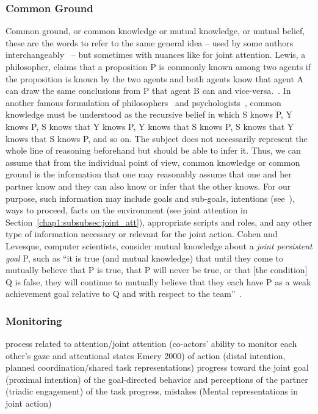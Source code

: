 \documentclass[a4paper,11pt,twoside]{StyleThese}
\begin{document}
\subsubsection{Common Ground}
Common ground, or common knowledge or mutual knowledge, or mutual belief, these are the words to refer to the same general idea -- used by some authors interchangeably~\cite{clark_1992_arenas, clark_1996_using} -- but sometimes with nuances like for joint attention. Lewis, a philosopher, claims that a proposition P is commonly known among two agents if the proposition is known by the two agents and both agents know that agent A can draw the same conclusions from P that agent B can and vice-versa.~\cite{lewis_1969_convention}. In another famous formulation of philosophers~\cite{schiffer_1972_meaning} and psychologists~\cite{thomas_2014_psychology}, common knowledge must be understood as the recursive belief in which S knows P, Y knows P, S knows that Y knows P, Y knows that S knows P, S knows that Y knows that S knows P, and so on. The subject does not necessarily represent the whole line of reasoning beforehand but should be able to infer it. Thus, we can assume that from the individual point of view, common knowledge or common ground is the information that one may reasonably assume that one and her partner know and they can also know or infer that the other knows. For our purpose, such information may include goals and sub-goals, intentions (see~\cite{bratman_1992_coop}), ways to proceed, facts on the environment (see joint attention in Section~\ref{chap1:subsubsec:joint_att}), appropriate scripts and roles, and any other type of information necessary or relevant for the joint action. Cohen and Levesque, computer scientists, consider mutual knowledge about a \textit{joint persistent goal} P, such as ``it is true (and mutual knowledge) that until they come to mutually believe that P is true, that P will never be true, or that [the condition] Q is false, they will continue to mutually believe that they each have P as a weak achievement goal relative to Q and with respect to the team''~\cite[p.~499]{cohen_1991_teamwork}.



\subsubsection{Monitoring}
process related to attention/joint attention (co-actors’ ability to monitor each other’s gaze and attentional states Emery 2000)
of action (distal intention, planned coordination/shared task representations)
progress toward the joint goal (proximal intention)
of the goal-directed behavior and perceptions of the partner (triadic engagement)
of the task progress, mistakes (Mental representations in joint action)
\end{document}
